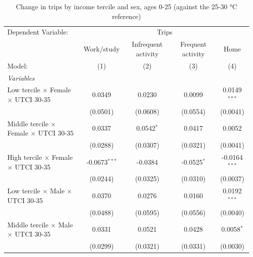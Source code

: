 
\begin{table}[htbp]
   \caption{\label{table_rq3_0-25} Change in trips by income tercile and sex, ages 0-25 (against the 25-30 °C reference)}
   \centering
   \scriptsize
   \renewcommand*{\arraystretch}{0.75}
   \begin{tabular}{lcccc}
      \tabularnewline \midrule \midrule
      Dependent Variable: & \multicolumn{4}{c}{Trips}\\
                                                           & Work/study      & Infrequent activity & Frequent activity & Home \\   
      Model:                                               & (1)             & (2)                 & (3)               & (4)\\  
      \midrule
      \emph{Variables}\\
      Low tercile $\times$ Female $\times$ UTCI 30-35      & 0.0349          & 0.0230              & 0.0099            & 0.0149$^{***}$\\   
                                                           & (0.0501)        & (0.0608)            & (0.0554)          & (0.0041)\\   
      Middle tercile $\times$ Female $\times$ UTCI 30-35   & 0.0337          & 0.0542$^{*}$        & 0.0417            & 0.0052\\   
                                                           & (0.0288)        & (0.0307)            & (0.0321)          & (0.0041)\\   
      High tercile $\times$ Female $\times$ UTCI 30-35     & -0.0673$^{***}$ & -0.0384             & -0.0525$^{*}$     & -0.0164$^{***}$\\   
                                                           & (0.0244)        & (0.0325)            & (0.0310)          & (0.0037)\\   
      Low tercile $\times$ Male $\times$ UTCI 30-35        & 0.0370          & 0.0276              & 0.0160            & 0.0192$^{***}$\\   
                                                           & (0.0488)        & (0.0595)            & (0.0556)          & (0.0040)\\   
      Middle tercile $\times$ Male $\times$ UTCI 30-35     & 0.0331          & 0.0521              & 0.0428            & 0.0058$^{*}$\\   
                                                           & (0.0299)        & (0.0321)            & (0.0331)          & (0.0030)\\   

\end{tabular}
\end{table}
